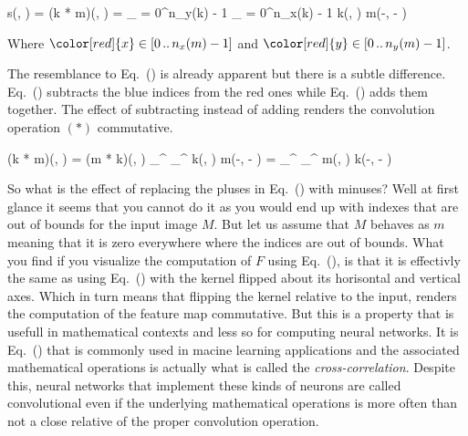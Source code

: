 \startplaceformula[reference=twodim-disc-conv-finite]
\startformula
s(\color[red]{x}, \color[red]{y}) = (k * m)(\color[red]{x}, \color[red]{y}) = 
\sum_{\color[blue]{y} = 0}^{n_y(k) - 1} 
\sum_{\color[blue]{x} = 0}^{n_x(k) - 1} 
k(\color[blue]{x}, \color[blue]{y}) \cdot m(\color[red]{x}-\color[blue]{x}, \color[red]{y} - \color[blue]{y})
\stopformula
\stopplaceformula

Where $\color[red]{x} \in [0 \, .. \, n_x(m) - 1]$ and $\color[red]{y} \in [0 \, .. \, n_y(m) - 1]$.

The resemblance to Eq.~() is already apparent but there is a subtle difference.
Eq.~() subtracts the blue indices from the red ones while Eq.~() adds them together.
The effect of subtracting instead of adding renders the convolution operation $(*)$ commutative.

\startplaceformula[reference=conv-commute]
\startformula
\startmathalignment
\NC (k * m)(\color[red]{x}, \color[red]{y}) \NC = (m * k)(\color[blue]{x}, \color[blue]{y}) \NR
\NC \sum_{\color[blue]{x}}^{} \sum_{\color[blue]{y}}^{} k(\color[blue]{x}, \color[blue]{y}) \cdot m(\color[red]{x}-\color[blue]{x}, \color[red]{y} - \color[blue]{y}) \NC
= \sum_{\color[red]{x}}^{} \sum_{\color[red]{y}}^{} m(\color[red]{x}, \color[red]{y}) \cdot k(\color[blue]{x}-\color[red]{x}, \color[blue]{y} - \color[red]{y}) \NR
\stopmathalignment
\stopformula
\stopplaceformula

\indentation
So what is the effect of replacing the pluses in Eq.~() with minuses?
Well at first glance it seems that you cannot do it as you would end up with indexes that are out of bounds for the input image $M$.
But let us assume that $M$ behaves as $m$ meaning that it is zero everywhere where the indices are out of bounds.
What you find if you visualize the computation of $F$ using Eq.~(), is that it is effectivly the same as using Eq.~() with the kernel flipped about its horisontal and vertical axes.
Which in turn means that flipping the kernel relative to the input, renders the computation of the feature map commutative.
But this is a property that is usefull in mathematical contexts and less so for computing neural networks.
It is Eq.~() that is commonly used in macine learning applications and the associated mathematical operations is actually what is called the {\em cross-correlation}.
Despite this, neural networks that implement these kinds of neurons are called convolutional even if the underlying mathematical operations is more often than not a close relative of the proper convolution operation.
\stopsubsubsection

